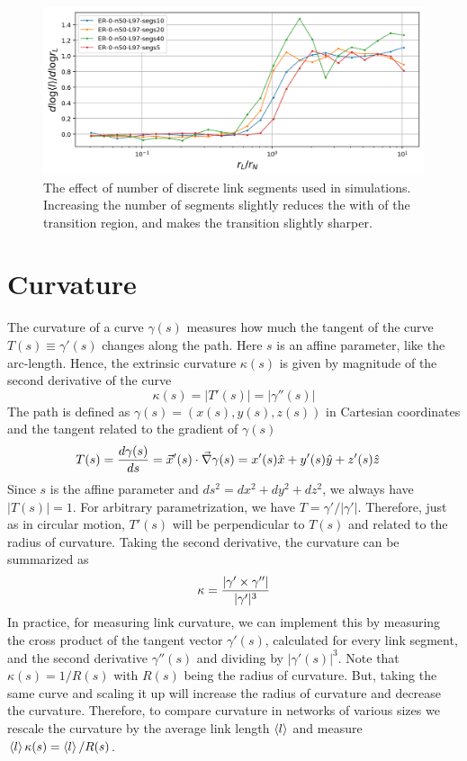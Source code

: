 \documentclass[12pt]{article}%
\begin{document}
\begin{figure}
    \centering
    \includegraphics[width=.7\textwidth]{fig-09-19/ER-segs.png}
    \caption{\scriptsize The effect of number of discrete link segments used in simulations.
    Increasing the number of segments slightly reduces the with of the transition region, and makes the transition slightly sharper. 
    }
    \label{fig:er-segs}
\end{figure}

\section{Curvature\label{ap:curvature}}
The curvature of a curve $\gamma(s)$ measures how much the tangent of the curve $T(s) \equiv \gamma'(s)$ changes along the path. 
Here $s$ is an affine parameter, like the arc-length.  
Hence, the extrinsic curvature $\kappa(s)$ is given by magnitude of the second derivative of the curve 
\begin{equation}
    \kappa(s) = |T'(s)| = |\gamma''(s)|
\end{equation}
The path is defined as $\gamma(s) = (x(s),y(s),z(s))$ in Cartesian coordinates and the tangent related to the gradient of $\gamma(s)$
\begin{align}
    T(s) &= {d \gamma(s) \over ds} = \vec{x}'(s)\cdot \vec{\nabla} \gamma(s) = x'(s)\hat{x}+y'(s)\hat{y}+z'(s)\hat{z} 
\end{align}
Since $s$ is the affine parameter and $ds^2 = dx^2 + dy^2 + dz^2$, we always have $|T(s)|=1$. 
For arbitrary parametrization, we have $T = \gamma'/|\gamma'|$.
Therefore, just as in circular motion, $T'(s)$ will be perpendicular to $T(s)$ and related to the radius of curvature. 
Taking the second derivative, the curvature can be summarized as 
\begin{equation}
    \kappa = {|\gamma'\times \gamma''|\over |\gamma'|^{3}}
\end{equation}
In practice, for measuring link curvature, we can implement this by measuring the cross product of the tangent vector $\gamma'(s)$, calculated for every link segment, and the second derivative $\gamma''(s)$ and dividing by $|\gamma'(s)|^3$. 
Note that $\kappa(s) = 1/R(s)$ with $R(s)$ being the radius of curvature. 
But, taking the same curve and scaling it up will increase the radius of curvature and decrease the curvature. 
Therefore, to compare curvature in networks of various sizes we rescale the curvature by the average link length $\left<l\right>$ and measure $\left<l\right>\kappa(s) = \left<l\right>/R(s)$.
\end{document}
